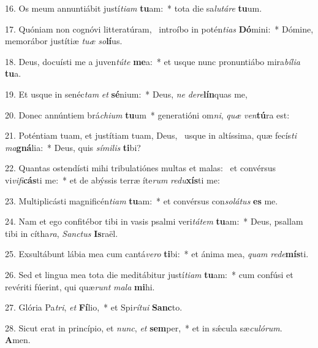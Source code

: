 16. Os meum annuntiábit justí\textit{ti}\textit{am} \textbf{tu}am:~*  tota die sa\textit{lu}\textit{tá}\textit{re} \textbf{tu}um.\

17. Quóniam non cognóvi litteratúram, \dag\  introíbo in potén\textit{ti}\textit{as} \textbf{Dó}mini:~*  Dómine, memorábor justítiæ \textit{tu}\textit{æ} \textit{so}\textbf{lí}us.\

18. Deus, docuísti me a juven\textit{tú}\textit{te} \textbf{me}a:~*  et usque nunc pronuntiábo mira\textit{bí}\textit{li}\textit{a} \textbf{tu}a.\

19. Et usque in senéc\textit{tam} \textit{et} \textbf{sé}nium:~*  Deus, \textit{ne} \textit{de}\textit{re}\textbf{lín}quas me,\

20. Donec annúntiem brá\textit{chi}\textit{um} \textbf{tu}um~*  generatióni om\textit{ni}, \textit{quæ} \textit{ven}\textbf{tú}ra est:\

21. Poténtiam tuam, et justítiam tuam, Deus, \dag\  usque in altíssima, quæ fecís\textit{ti} \textit{ma}\textbf{gná}lia:~*  Deus, quis \textit{sí}\textit{mi}\textit{lis} \textbf{ti}bi?\

22. Quantas ostendísti mihi tribulatiónes multas et malas: \dag\  et convérsus vi\textit{vi}\textit{fi}\textbf{cás}ti me:~*  et de abýssis terræ íte\textit{rum} \textit{re}\textit{du}\textbf{xís}ti me:\

23. Multiplicásti magnificén\textit{ti}\textit{am} \textbf{tu}am:~*  et convérsus con\textit{so}\textit{lá}\textit{tus} \textbf{es} me.\

24. Nam et ego confitébor tibi in vasis psalmi veri\textit{tá}\textit{tem} \textbf{tu}am:~*  Deus, psallam tibi in cítha\textit{ra}, \textit{Sanc}\textit{tus} \textbf{Is}raël.\

25. Exsultábunt lábia mea cum cantá\textit{ve}\textit{ro} \textbf{ti}bi:~*  et ánima mea, \textit{quam} \textit{red}\textit{e}\textbf{mís}ti.\

26. Sed et lingua mea tota die meditábitur justí\textit{ti}\textit{am} \textbf{tu}am:~*  cum confúsi et revériti fúerint, qui quæ\textit{runt} \textit{ma}\textit{la} \textbf{mi}hi.\

27. Glória Pa\textit{tri}, \textit{et} \textbf{Fí}lio,~*  et Spi\textit{rí}\textit{tu}\textit{i} \textbf{Sanc}to.\

28. Sicut erat in princípio, et \textit{nunc}, \textit{et} \textbf{sem}per,~*  et in sǽcula sæ\textit{cu}\textit{ló}\textit{rum}. \textbf{A}men.\

